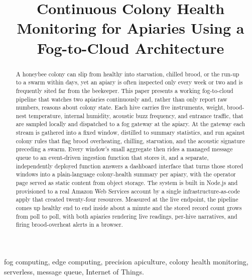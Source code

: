 \documentclass[conference]{IEEEtran}
\begin{document}
\title{Continuous Colony Health Monitoring for Apiaries Using a Fog-to-Cloud Architecture}

\author{
}

\maketitle

\begin{abstract}
A honeybee colony can slip from healthy into starvation, chilled brood, or the run-up to a swarm within days, yet an apiary is often inspected only every week or two and is frequently sited far from the beekeeper. This paper presents a working fog-to-cloud pipeline that watches two apiaries continuously and, rather than only report raw numbers, reasons about colony state. Each hive carries five instruments, weight, brood-nest temperature, internal humidity, acoustic buzz frequency, and entrance traffic, that are sampled locally and dispatched to a fog gateway at the apiary. At the gateway each stream is gathered into a fixed window, distilled to summary statistics, and run against colony rules that flag brood overheating, chilling, starvation, and the acoustic signature preceding a swarm. Every window's small aggregate then rides a managed message queue to an event-driven ingestion function that stores it, and a separate, independently deployed function answers a dashboard interface that turns those stored windows into a plain-language colony-health summary per apiary, with the operator page served as static content from object storage. The system is built in Node.js and provisioned to a real Amazon Web Services account by a single infrastructure-as-code apply that created twenty-four resources. Measured at the live endpoint, the pipeline comes up healthy end to end inside about a minute and the stored record count grows from poll to poll, with both apiaries rendering live readings, per-hive narratives, and firing brood-overheat alerts in a browser.
\end{abstract}

\begin{IEEEkeywords}
fog computing, edge computing, precision apiculture, colony health monitoring, serverless, message queue, Internet of Things.
\end{IEEEkeywords}
\end{document}
